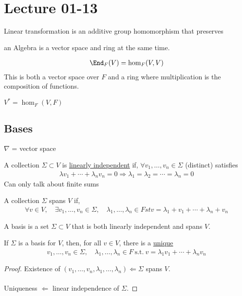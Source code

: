 \documentclass[class=scrartcl, crop=false]{standalone}
\date{2020-01-13}
\begin{document}
\section{Lecture 01-13}

Linear transformation is an additive group homomorphism that preserves 

an Algebra is a vector space and ring at the same time.

\begin{gather*}
  \End_F(V) = \hom_F(V, V)
\end{gather*} 
This is both a vector space over $F$ and a ring where multiplication is the composition of functions.

\begin{definition}
  $V^* = \hom_F(V, F)$
\end{definition} 

\subsection{Bases}

$\nabla$ = vector space

\begin{definition}
  A collection $\Sigma \subset V$ is \ul{linearly independent} if, $\forall v_1, \dots, v_n \in \Sigma$ (distinct) satisfies  
  \begin{gather*}
    \lambda v_1 + \cdots + \lambda_n v_n = 0 \Rightarrow \lambda_1 = \lambda_2 = \cdots = \lambda_n = 0
  \end{gather*} 
  Can only talk about finite sums %
\end{definition} 

\begin{definition}
  A collection $\Sigma$ spans $V$ if, 
  \begin{gather*}
    \forall v \in V, \quad \exists v_1, \dots, v_n \in \Sigma, \quad \lambda_1, \dots, \lambda_n \in F st v = \lambda_1 + v_1 + \cdots + \lambda_n + v_n %
  \end{gather*} 
\end{definition} 

\begin{definition}[Basis]
  A basis is a set $\Sigma \subset V$ that is both linearly independent and spans $V$.
\end{definition} 

\begin{proposition}
  If $\Sigma$ is a basis for $V$, then, for all $v \in V$, there is a \ul{unique} 
  \begin{gather*}
    v_1, \dots, v_n \in \Sigma, \quad \lambda_1, \dots, \lambda_n \in F \ \text{s.t.} \ v = \lambda_1 v_1 + \cdots + \lambda_n v_n
  \end{gather*} 
  \begin{proof}
    Existence of $(v_1, \dots, v_n, \lambda_1, \dots, \lambda_n) \Leftarrow \Sigma$ spans $V$.
    \\\\
    Uniqueness $\Leftarrow$ linear independence of $\Sigma$.
  \end{proof} 
\end{proposition} 
\end{document}
